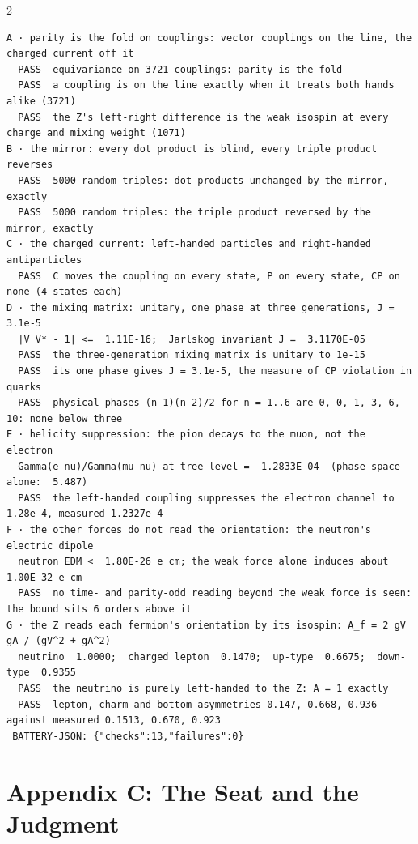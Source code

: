 \documentclass[10pt]{article}
\begin{document}
\begin{multicols}{2}
\begin{Verbatim}[fontsize=\fontsize{6.2}{7.2}\selectfont,breaklines,breakanywhere,breaksymbolleft={}]
A · parity is the fold on couplings: vector couplings on the line, the charged current off it
  PASS  equivariance on 3721 couplings: parity is the fold
  PASS  a coupling is on the line exactly when it treats both hands alike (3721)
  PASS  the Z's left-right difference is the weak isospin at every charge and mixing weight (1071)
B · the mirror: every dot product is blind, every triple product reverses
  PASS  5000 random triples: dot products unchanged by the mirror, exactly
  PASS  5000 random triples: the triple product reversed by the mirror, exactly
C · the charged current: left-handed particles and right-handed antiparticles
  PASS  C moves the coupling on every state, P on every state, CP on none (4 states each)
D · the mixing matrix: unitary, one phase at three generations, J = 3.1e-5
  |V V* - 1| <=  1.11E-16;  Jarlskog invariant J =  3.1170E-05
  PASS  the three-generation mixing matrix is unitary to 1e-15
  PASS  its one phase gives J = 3.1e-5, the measure of CP violation in quarks
  PASS  physical phases (n-1)(n-2)/2 for n = 1..6 are 0, 0, 1, 3, 6, 10: none below three
E · helicity suppression: the pion decays to the muon, not the electron
  Gamma(e nu)/Gamma(mu nu) at tree level =  1.2833E-04  (phase space alone:  5.487)
  PASS  the left-handed coupling suppresses the electron channel to 1.28e-4, measured 1.2327e-4
F · the other forces do not read the orientation: the neutron's electric dipole
  neutron EDM <  1.80E-26 e cm; the weak force alone induces about  1.00E-32 e cm
  PASS  no time- and parity-odd reading beyond the weak force is seen: the bound sits 6 orders above it
G · the Z reads each fermion's orientation by its isospin: A_f = 2 gV gA / (gV^2 + gA^2)
  neutrino  1.0000;  charged lepton  0.1470;  up-type  0.6675;  down-type  0.9355
  PASS  the neutrino is purely left-handed to the Z: A = 1 exactly
  PASS  lepton, charm and bottom asymmetries 0.147, 0.668, 0.936 against measured 0.1513, 0.670, 0.923
 BATTERY-JSON: {"checks":13,"failures":0}
\end{Verbatim}
\end{multicols}

\hypertarget{appendix-c-the-seat-and-the-judgment}{%
\section{Appendix C: The Seat and the
Judgment}\label{appendix-c-the-seat-and-the-judgment}}
\end{document}
